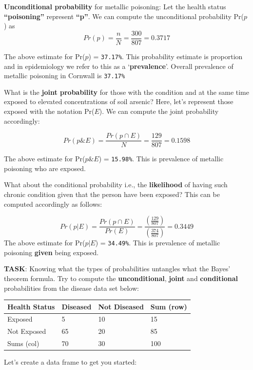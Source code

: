 \documentclass[
]{book}
\begin{document}
\textbf{Unconditional probability} for metallic poisoning: Let the health status \textbf{``poisoning''} represent \textbf{``p''}. We can compute the unconditional probability Pr(\(p\)) as \[Pr(p)= \frac{n}{N} = \frac{300}{807} = 0.3717\]

The above estimate for Pr(\(p\)) = \texttt{37.17\%}. This probability estimate is proportion and in epidemiology we refer to this as a `\textbf{prevalence}'. Overall prevalence of metallic poisoning in Cornwall is \texttt{37.17\%}

What is the \textbf{joint probability} for those with the condition and at the same time exposed to elevated concentrations of soil arsenic? Here, let's represent those exposed with the notation Pr(\(E\)). We can compute the joint probability accordingly:

\[Pr(p \& E) =  \frac{Pr(p \cap E)}{N} = \frac{129}{807} = 0.1598\]

The above estimate for Pr(\(p \& E\)) = \texttt{15.98\%}. This is prevalence of metallic poisoning who are exposed.

What about the conditional probability i.e., the \textbf{likelihood} of having such chronic condition given that the person have been exposed? This can be computed accordingly as follows:

\[Pr(p | E) = \frac{Pr(p \cap E)}{Pr(E)} = \frac{(\frac{129}{807})}{(\frac{374}{807})} = 0.3449\]
The above estimate for Pr(\(p | E\)) = \texttt{34.49\%}. This is prevalence of metallic poisoning \textbf{given} being exposed.

\textbf{TASK}: Knowing what the types of probabilities untangles what the Bayes' theorem formula. Try to compute the \textbf{unconditional}, \textbf{joint} and \textbf{conditional} probabilities from the disease data set below:

\begin{longtable}[]{@{}llll@{}}
\toprule
Health Status & Diseased & Not Diseased & Sum (row) \\
\midrule
\endhead
Exposed & 5 & 10 & 15 \\
Not Exposed & 65 & 20 & 85 \\
Sums (col) & 70 & 30 & 100 \\
\bottomrule
\end{longtable}

Let's create a data frame to get you started:
\end{document}
